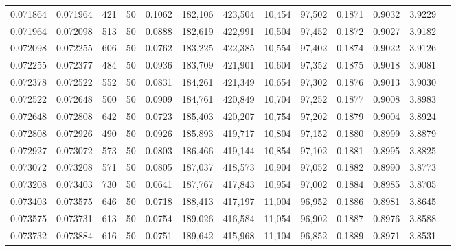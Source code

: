 \begin{tabular}{rrrrrrrrrrrrr}
0.071864 & 0.071964 &   421 &  50 &                                     0.1062 & 182,106 & 423,504 &  10,454 &  97,502 & 0.1871 & 0.9032 & 3.9229 \\
0.071964 & 0.072098 &   513 &  50 &                                     0.0888 & 182,619 & 422,991 &  10,504 &  97,452 & 0.1872 & 0.9027 & 3.9182 \\
0.072098 & 0.072255 &   606 &  50 &                                     0.0762 & 183,225 & 422,385 &  10,554 &  97,402 & 0.1874 & 0.9022 & 3.9126 \\
0.072255 & 0.072377 &   484 &  50 &                                     0.0936 & 183,709 & 421,901 &  10,604 &  97,352 & 0.1875 & 0.9018 & 3.9081 \\
0.072378 & 0.072522 &   552 &  50 &                                     0.0831 & 184,261 & 421,349 &  10,654 &  97,302 & 0.1876 & 0.9013 & 3.9030 \\
0.072522 & 0.072648 &   500 &  50 &                                     0.0909 & 184,761 & 420,849 &  10,704 &  97,252 & 0.1877 & 0.9008 & 3.8983 \\
0.072648 & 0.072808 &   642 &  50 &                                     0.0723 & 185,403 & 420,207 &  10,754 &  97,202 & 0.1879 & 0.9004 & 3.8924 \\
0.072808 & 0.072926 &   490 &  50 &                                     0.0926 & 185,893 & 419,717 &  10,804 &  97,152 & 0.1880 & 0.8999 & 3.8879 \\
0.072927 & 0.073072 &   573 &  50 &                                     0.0803 & 186,466 & 419,144 &  10,854 &  97,102 & 0.1881 & 0.8995 & 3.8825 \\
0.073072 & 0.073208 &   571 &  50 &                                     0.0805 & 187,037 & 418,573 &  10,904 &  97,052 & 0.1882 & 0.8990 & 3.8773 \\
0.073208 & 0.073403 &   730 &  50 &                                     0.0641 & 187,767 & 417,843 &  10,954 &  97,002 & 0.1884 & 0.8985 & 3.8705 \\
0.073403 & 0.073575 &   646 &  50 &                                     0.0718 & 188,413 & 417,197 &  11,004 &  96,952 & 0.1886 & 0.8981 & 3.8645 \\
0.073575 & 0.073731 &   613 &  50 &                                     0.0754 & 189,026 & 416,584 &  11,054 &  96,902 & 0.1887 & 0.8976 & 3.8588 \\
0.073732 & 0.073884 &   616 &  50 &                                     0.0751 & 189,642 & 415,968 &  11,104 &  96,852 & 0.1889 & 0.8971 & 3.8531 \\

\end{tabular}
